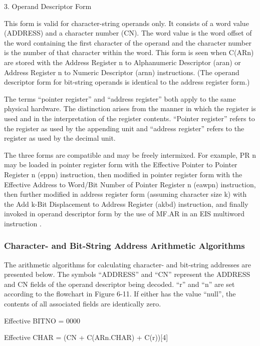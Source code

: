 3. Operand Descriptor Form

This form is valid for character-string operands only. It consists of a word
value (ADDRESS) and a character number (CN). The word value is the word offset
of the word containing the first character of the operand and the character
number is the number of that character within the word. This form is seen when
C(ARn) are stored with the Address Register n to Alphanumeric Descriptor (aran)
or Address Register n to Numeric Descriptor (arnn) instructions. (The operand
descriptor form for bit-string operands is identical to the address register
form.)


The terms {``}pointer register'' and {``}address register'' both apply to the
same physical hardware. The distinction arises from the manner in which the
register is used and in the interpretation of the register contents.
{``}Pointer register'' refers to the register as used by the appending unit and
{``}address register'' refers to the register as used by the decimal unit.


The three forms are compatible and may be freely intermixed. For example, PR n
may be loaded in pointer register form with the Effective Pointer to Pointer
Register n (eppn) instruction, then modified in pointer register form with the
Effective Address to Word/Bit Number of Pointer Register n (eawpn) instruction,
then further modified in address register form (assuming character size k) with
the Add k-Bit Displacement to Address Register (akbd) instruction, and finally
invoked in operand descriptor form by the use of MF.AR in an EIS multiword
instruction .  

\subsubsection{Character- and Bit-String Address Arithmetic Algorithms}

The arithmetic algorithms for calculating character- and bit-string addresses
are presented below.  The symbols {``}ADDRESS'' and {``}CN'' represent the
ADDRESS and CN fields of the operand descriptor being decoded. {``}r'' and
{``}n'' are set according to the flowchart in Figure 6-11. If either has the
value {``}null'', the contents of all associated fields are identically zero.  




Effective BITNO = 0000

Effective CHAR = (CN + C(ARn.CHAR) + C(r))[4]

